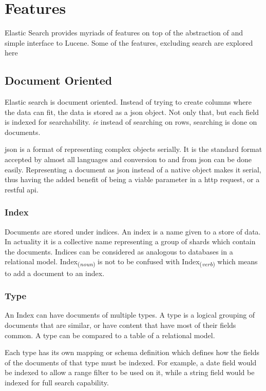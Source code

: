 \documentclass[12pt]{article}
\begin{document}
	\section{Features}
		Elastic Search provides myriads of features on top of the abstraction of and simple interface to Lucene. Some of the features, excluding search are explored here

		\subsection{Document Oriented}
			Elastic search is document oriented. Instead of trying to create columns where the data can fit, the data is stored as a \ac{json} object. Not only that, but each field is indexed for searchability. \emph{ie} instead of searching on rows, searching is done on documents.\cite{book}

			\ac{json} is a format of representing complex objects serially. It is the standard format accepted by almost all languages and conversion to and from \ac{json} can be done easily. Representing a document as \ac{json} instead of a native object makes it serial, thus having the added benefit of being a viable parameter in a \ac{http} request, or a \ac{rest}ful \ac{api}.
			
			\subsubsection{Index}
			Documents are stored under indices. An index is a name given to a store of data. In actuality it is a collective name representing a group of shards which contain the documents. Indices can be considered as analogous to databases in a relational model. Index\textsubscript{(\emph{noun})} is not to be confused with Index\textsubscript{(\emph{verb})} which means to add a document to an index.

			\subsubsection{Type}
			An Index can have documents of multiple types. A type is a logical grouping of documents that are similar, or have content that have most of their fields common. A type can be compared to a table of a relational model. 

			Each type has its own mapping or schema definition which defines how the fields of the documents of that type must be indexed. For example, a date field would be indexed to allow a range filter to be used on it, while a string field would be indexed for full search capability.
\end{document}
